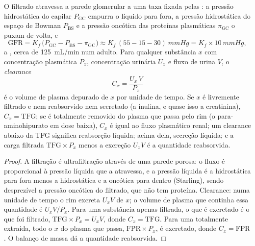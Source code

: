 \begin{theorem}\label{thm:b3:renal-osmoregulation:clearance}
O filtrado atravessa a parede glomerular a uma taxa fixada pelas
\emph{}: a pressão hidrostática do capilar
$P_{\text{GC}}$ empurra o líquido para fora, a pressão hidrostática do
espaço de Bowman $P_{\text{BS}}$ e a pressão oncótica das proteínas
plasmáticas $\pi_{\text{GC}}$ o puxam de volta, e
\[
\text{GFR} = K_{f}\,\bigl(P_{\text{GC}} - P_{\text{BS}} - \pi_{\text{GC}}\bigr)
\approx K_{f}\,(55 - 15 - 30)\ \unit{mmHg} = K_{f}\times \qty{10}{mmHg},
\]
a \emph{}, cerca de \qty{125}{mL/min} num
adulto. Para qualquer substância $x$ com concentração plasmática
$P_{x}$, concentração urinária $U_{x}$ e fluxo de urina $V$, o
\emph{clearance}
\[
C_{x} = \frac{U_{x}\,V}{P_{x}}
\]
é o volume de plasma depurado de $x$ por unidade de tempo. Se $x$ é
livremente filtrado e nem reabsorvido nem secretado (a inulina, e quase
isso a creatinina), $C_{x} = \text{TFG}$; se é totalmente removido do
plasma que passa pelo rim (o para-aminohipurato em dose baixa), $C_{x}$
é igual ao fluxo plasmático renal; um clearance abaixo da TFG significa
reabsorção líquida; acima dela, secreção líquida; e a carga filtrada
$\text{TFG}
\times P_{x}$ menos a excreção $U_{x}V$ é a quantidade
reabsorvida.
\end{theorem}
\begin{proof}
A filtração é ultrafiltração através de uma parede porosa: o fluxo é
proporcional à pressão líquida que a atravessa, e a pressão líquida é a
hidrostática para fora menos a hidrostática e a oncótica para dentro
(Starling), sendo desprezível a pressão oncótica do filtrado, que não
tem proteína. Clearance: numa unidade de tempo o rim excreta $U_{x}V$ de
$x$; o volume de plasma que continha essa quantidade é $U_{x}V/P_{x}$.
Para uma substância apenas filtrada, o que é excretado é o que foi
filtrado, $\text{TFG}\times P_{x} = U_{x}V$, donde $C_{x} = \text{TFG}$.
Para uma totalmente extraída, todo o $x$ do plasma que passa,
$\text{FPR}\times P_{x}$, é excretado, donde $C_{x} = \text{FPR}$. O
balanço de massa dá a quantidade reabsorvida.
\end{proof}

